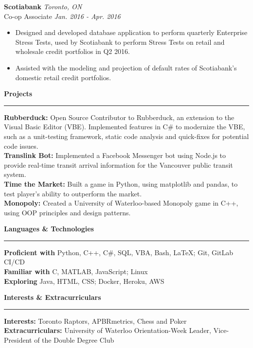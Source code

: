\documentclass{letter}
\begin{document}
\begin{flushleft}
		{\large\textbf{Scotiabank}}  \hfill \textit{Toronto, ON} \\
		\vspace{1pt}
		Co-op Associate \hfill \textit{Jan. 2016 - Apr. 2016}
		\vspace{-9pt}
		\begin{itemize}
			\item Designed and developed database application to perform quarterly Enterprise Stress Tests, used by Scotiabank to perform Stress Tests on retail and wholesale credit portfolios in Q2 2016.\vspace{-3pt}
			\item Assisted with the modeling and projection of default rates of Scotiabank's domestic retail credit portfolios. 
		\end{itemize}
	\end{flushleft}

	\begin{flushleft}
		{\Large \textbf{Projects}}
		\rule[5pt]{\textwidth}{0.4pt}
		\textbf{Rubberduck:} Open Source Contributor to Rubberduck, an extension to the Visual Basic Editor (VBE). Implemented features in C\# to modernize the VBE, such as a unit-testing framework, static code analysis and quick-fixes for potential code issues.\\
		\textbf{Translink Bot:} Implemented a Facebook Messenger bot using Node.js to provide real-time transit arrival information for the Vancouver public transit system.\\
		\textbf{Time the Market:} Built a game in Python, using matplotlib and pandas, to test player's ability to outperform the market.\\
		\textbf{Monopoly:} Created a University of Waterloo-based Monopoly game in C++, using OOP principles and design patterns.
	\end{flushleft}
	
	\begin{flushleft}
		{\Large \textbf{Languages \& Technologies}}
		\rule[5pt]{\textwidth}{0.4pt}
		\textbf{Proficient with} Python, C++, C\#, SQL, VBA, Bash, \LaTeX; Git, GitLab CI/CD\\
		\textbf{Familiar with} C, MATLAB, JavaScript; Linux \\
		\textbf{Exploring} Java, HTML, CSS; Docker, Heroku, AWS
	\end{flushleft}

	\begin{flushleft}
		{\Large \textbf{Interests \& Extracurriculars}}
		\rule[5pt]{\textwidth}{0.4pt}
		\textbf{Interests:} Toronto Raptors, APBRmetrics, Chess and Poker\\
		\textbf{Extracurriculars:} University of Waterloo Orientation-Week Leader, Vice-President of the Double Degree Club
	\end{flushleft}
\end{document}
